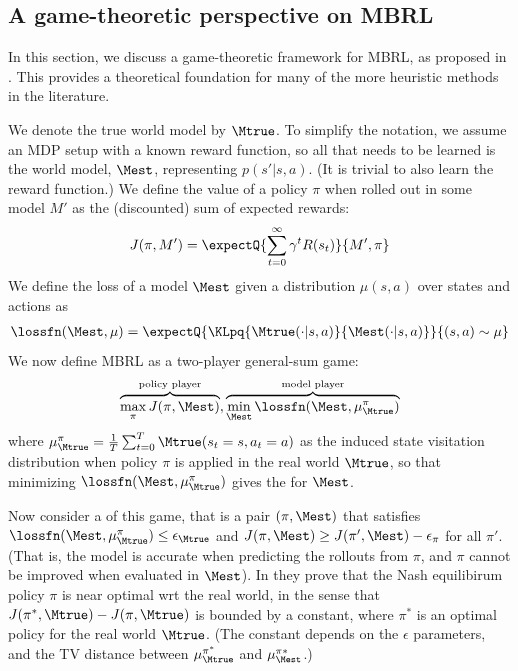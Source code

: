 \subsection{A game-theoretic perspective on MBRL}
\label{sec:MBRLgame}


In this section, we discuss a game-theoretic framework for 
MBRL, as proposed in  \citep{Rajeswaran2020}. This provides a theoretical
foundation for many of the more heuristic methods in the literature.

We denote the true world model  by $\Mtrue$.
To simplify the notation, we assume an MDP setup with a known 
reward function,
so all that needs to be learned is the world model, $\Mest$, representing
$p(s'|s,a)$.
(It is trivial to also learn the reward function.)
We define the value of a policy $\pi$ when rolled out in some model $M'$
as the (discounted) sum of expected rewards:
\begin{align*}
J(\pi,M') = \expectQ{\sum_{t=0}^{\infty} \gamma^t R(s_t)}{M',\pi}
\end{align*}
We define the loss of a model $\Mest$ given a distribution
$\mu(s,a)$ over states and actions as
\begin{align*}
  \lossfn(\Mest,\mu) = \expectQ{\KLpq{\Mtrue(\cdot|s,a)}{\Mest(\cdot|s,a)}}
  {(s,a) \sim \mu}
\end{align*}
We now define MBRL as a two-player general-sum game:
\begin{align*}
  \overbrace{\max_{\pi} J(\pi, \Mest)}^{\text{policy player}},
  \overbrace{\min_{\Mest} \lossfn(\Mest, \mu_{\Mtrue}^{\pi})}^{\text{model player}}
\end{align*}
where $\mu_{\Mtrue}^{\pi} = \frac{1}{T} \sum_{t=0}^T \Mtrue(s_t=s,a_t=a)$
as the induced state visitation distribution when policy
$\pi$ is applied in the real world $\Mtrue$,
so that
minimizing $\lossfn(\Mest, \mu_{\Mtrue}^{\pi})$ gives the
 for $\Mest$.

Now consider a 
of this game, that is a pair $(\pi,\Mest)$ that satisfies
$\lossfn(\Mest,\mu_{\Mtrue}^{\pi}) \leq \epsilon_{\Mtrue}$
and $J(\pi,\Mest) \geq J(\pi', \Mest) - \epsilon_{\pi}$ for all $\pi'$.
(That is, the model is accurate when predicting the rollouts from  $\pi$,
and $\pi$ cannot be improved when evaluated in $\Mest$).
In  \citep{Rajeswaran2020} they prove that the
Nash equilibirum
policy $\pi$ is  near optimal wrt the real world,
in the sense that $J(\pi^*, \Mtrue) - J(\pi,\Mtrue)$ is bounded by a constant,
where $\pi^*$ is an optimal policy for the real world $\Mtrue$.
(The constant depends  on the $\epsilon$ parameters,
and the TV distance between $\mu_{\Mtrue}^{\pi^*}$
and $\mu_{\Mest}^{\pi*}$.)


